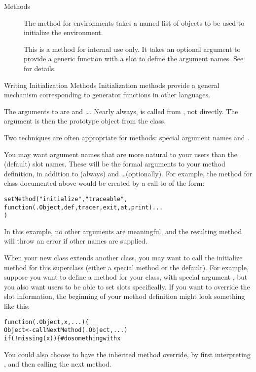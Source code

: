 \begin{Section}{Methods}
\begin{description}
\item[] 
The  method for environments takes a named list
of objects to be used to initialize the environment.


\item[] 
This is a method for internal use only.
It takes an optional  argument to provide a
generic function with a  slot to define the
argument names.  See  for details.


\end{description}

\end{Section}
%
\begin{Section}{Writing Initialization Methods}
Initialization methods provide a general mechanism corresponding to
generator functions in other languages.

The arguments to  are  and
\dots. Nearly always,  is called from ,
not directly.  The  argument is then the
prototype object from the class.

Two techniques are often appropriate for  methods:
special argument names and .

You may want argument names that are more natural to your users than
the (default) slot names.  These will be the formal arguments to
your method definition, in addition to  (always) and
\dots (optionally).  For example, the method for class
 documented above would be created by a call to
 of the form:

\begin{alltt}
    setMethod("initialize", "traceable",
      function(.Object, def, tracer, exit, at, print) ...
    )
  \end{alltt}


In this example, no other arguments are meaningful, and the resulting
method will throw an error if other names are supplied.

When your new class extends another class, you may want to call the
initialize method for this superclass (either a special method or the
default).  For example, suppose you want to define a method for your
class, with special argument , but you also want users to be
able to set slots specifically.  If you want  to override the
slot information, the beginning of your method definition might look
something like this:

\begin{alltt}
    function(.Object, x, ...) \{
      Object <- callNextMethod(.Object, ...)
      if(!missing(x)) \{ # do something with x
  \end{alltt}


You could also choose to have the inherited method override, by first
interpreting , and then calling the next method.

\end{Section}
